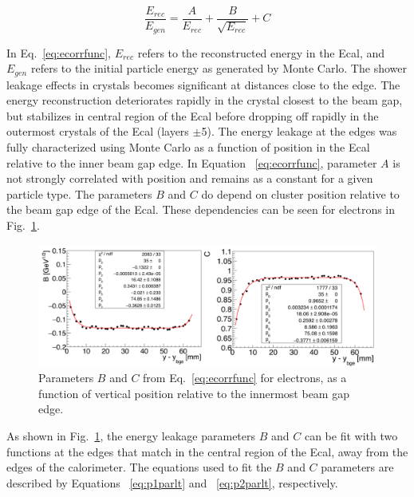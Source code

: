 \begin{equation}
	\label{eq:ecorrfunc}
	\dfrac{E_{rec}}{E_{gen}} = \dfrac{A}{E_{rec}}+\dfrac{B}{\sqrt{E_{rec}}}+C 
\end{equation}

In Eq.~\eqref{eq:ecorrfunc}, $E_{rec}$ refers to the reconstructed energy in the Ecal, and $E_{gen}$ refers to the initial particle energy as generated by Monte Carlo. The shower leakage effects in crystals becomes significant at distances close to the edge. The energy reconstruction deteriorates rapidly in the crystal closest to the beam gap, but stabilizes in central region of the Ecal before dropping off rapidly in the outermost crystals of the Ecal (layers $\pm$5). The energy leakage at the edges was fully characterized using Monte Carlo as a function of position in the Ecal relative to the inner beam gap edge. In Equation ~\eqref{eq:ecorrfunc}, parameter $A$ is not strongly correlated with position and remains as a constant for a given particle type. The parameters $B$ and $C$  do depend on cluster position relative to the beam gap edge of the Ecal. These dependencies can be seen for electrons in Fig.~\ref{Figure:sfparEdge}.

\begin{figure}[H]
  \centering
      \includegraphics[width=1.0\textwidth]{pics/performance/sfparEdgeFit.png}
  \caption[Ecal energy shower parameters for electrons relative to the inside beam gap edge]{Parameters $B$ and $C$ from Eq.~\ref{eq:ecorrfunc} for electrons, as a function of vertical position
relative to the innermost beam gap edge.}
  \label{Figure:sfparEdge}
\end{figure}

As shown in Fig.~\ref{Figure:sfparEdge}, the energy leakage parameters $B$ and $C$ can be fit with two functions at the edges that match in the central region of the Ecal, away from the edges of the calorimeter. The equations used to fit the $B$ and $C$ parameters are described by Equations ~\eqref{eq:p1parlt} and ~\eqref{eq:p2parlt}, respectively.

